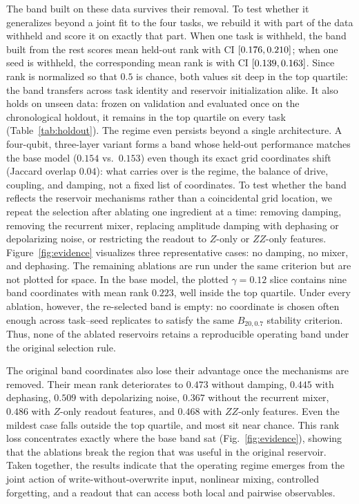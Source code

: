 \documentclass[10pt,conference]{IEEEtran}
\begin{document}
The band built on these data survives their removal. To test whether it generalizes beyond a joint fit to the four tasks, we rebuild it with part of the data withheld and score it on exactly that part. When one task is withheld, the band built from the rest scores mean held-out rank \PhaseLotoMeanRank{} with CI $[0.176,0.210]$; when one seed is withheld, the corresponding mean rank is \PhaseLosoMeanRank{} with CI $[0.139,0.163]$. Since rank is normalized so that $0.5$ is chance, both values sit deep in the top quartile: the band transfers across task identity and reservoir initialization alike. It also holds on unseen data: frozen on validation and evaluated once on the chronological holdout, it remains in the top quartile on every task (Table~\ref{tab:holdout}). The regime even persists beyond a single architecture. A four-qubit, three-layer variant forms a band whose held-out performance matches the base model ($0.154$ vs.\ $0.153$) even though its exact grid coordinates shift (Jaccard overlap $0.04$): what carries over is the regime, the balance of drive, coupling, and damping, not a fixed list of coordinates.
To test whether the band reflects the reservoir mechanisms rather than a coincidental grid location, we repeat the selection after ablating one ingredient at a time: removing damping, removing the recurrent mixer, replacing amplitude damping with dephasing or depolarizing noise, or restricting the readout to $Z$-only or $ZZ$-only features. Figure~\ref{fig:evidence} visualizes three representative cases: no damping, no mixer, and dephasing. The remaining ablations are run under the same criterion but are not plotted for space. In the base model, the plotted $\gamma=0.12$ slice contains nine band coordinates with mean rank $0.223$, well inside the top quartile. Under every ablation, however, the re-selected band is empty: no coordinate is chosen often enough across task--seed replicates to satisfy the same $B_{20,0.7}$ stability criterion. Thus, none of the ablated reservoirs retains a reproducible operating band under the original selection rule.

The original band coordinates also lose their advantage once the mechanisms are removed. Their mean rank deteriorates to $0.473$ without damping, $0.445$ with dephasing, $0.509$ with depolarizing noise, $0.367$ without the recurrent mixer, $0.486$ with $Z$-only readout features, and $0.468$ with $ZZ$-only features. Even the mildest case falls outside the top quartile, and most sit near chance. This rank loss concentrates exactly where the base band sat (Fig.~\ref{fig:evidence}), showing that the ablations break the region that was useful in the original reservoir. Taken together, the results indicate that the operating regime emerges from the joint action of write-without-overwrite input, nonlinear mixing, controlled forgetting, and a readout that can access both local and pairwise observables.
\end{document}
